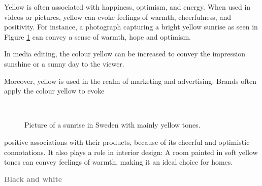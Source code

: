 \documentclass[../MasterThesis.tex]{subfiles}
\begin{document}
%
%
\begin{minipage}{0.45\textwidth}
	Yellow is often associated with happiness, optimism, and energy. When used in videos or pictures, yellow can evoke feelings of warmth, cheerfulness, and positivity. For instance, a photograph capturing a bright yellow sunrise as seen in Figure \ref{figure:yellow} can convey a sense of warmth, hope and optimism.
	
	In media editing, the colour yellow can be increased to convey the impression sunshine or a sunny day to the viewer.
	
	Moreover, yellow is used in the realm of marketing and advertising. Brands often apply the colour yellow to evoke 
	
	
\end{minipage}\begin{minipage}{0.05\textwidth}
	\ 
\end{minipage}\begin{minipage}{0.5\textwidth}
	\begin{figure}[H]
		\begin{center}
			\label{figure:yellow}
			\caption[Picture of a sunrise in Sweden with mainly yellow tones.]{Picture of a sunrise in Sweden with mainly yellow tones.}
		\end{center}
	\end{figure}\hfill
\end{minipage}

\vspace*{-1.4em}
positive associations with their products, because of its cheerful and optimistic connotations. It also plays a role in interior design: A room painted in soft yellow tones can convey feelings of warmth, making it an ideal choice for homes.





\textbf{\textcolor{gray}{Black and white}}
\end{document}

